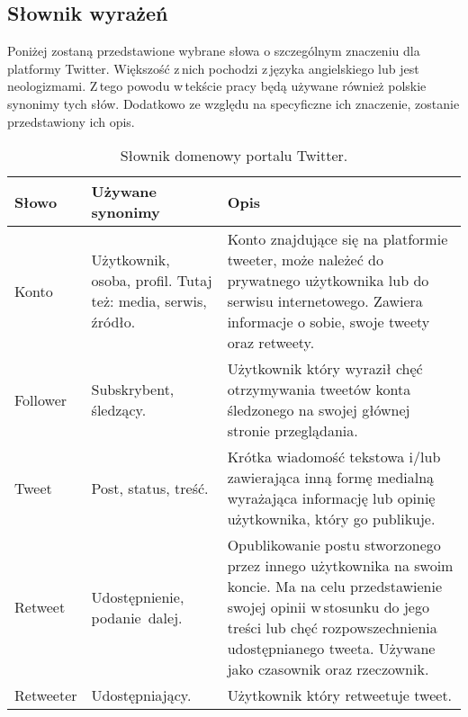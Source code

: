\subsection{Słownik wyrażeń}
Poniżej zostaną przedstawione wybrane słowa o szczególnym znaczeniu dla platformy Twitter. Większość z\,nich pochodzi z\,języka angielskiego lub jest neologizmami. Z\,tego powodu w\,tekście pracy będą używane również polskie synonimy tych słów. Dodatkowo ze względu na specyficzne ich znaczenie, zostanie przedstawiony ich opis.

\begin{table}[!h] \label{tab:slowniktwitter} \centering
\caption{Słownik domenowy portalu Twitter.}
\begin{tabular} { | m{2cm} | m{}| m{7cm} | } \hline
Słowo & Używane synonimy & Opis \\  \hline \hline
Konto & Użytkownik, osoba,
  profil. Tutaj też: media, serwis, źródło. & Konto
  znajdujące się na platformie tweeter, może należeć do prywatnego użytkownika
  lub do serwisu internetowego. Zawiera informacje o sobie, swoje tweety oraz
  retweety. \\ 
\hline
Follower & Subskrybent, śledzący. & Użytkownik który
  wyraził chęć otrzymywania tweetów konta śledzonego na swojej głównej stronie
  przeglądania. \\ 
\hline
Tweet & Post, status,
  treść. & Krótka wiadomość
  tekstowa i/lub zawierająca inną formę medialną wyrażająca informację lub
  opinię użytkownika, który go publikuje. \\ 
\hline
Retweet & Udostępnienie,
  \mbox{podanie dalej.} & Opublikowanie postu
  stworzonego przez innego użytkownika na swoim koncie. Ma na celu przedstawienie
  swojej opinii w\,stosunku do jego treści lub chęć rozpowszechnienia
  udostępnianego tweeta. Używane jako czasownik oraz rzeczownik. \\ 
\hline
Retweeter & Udostępniający. & Użytkownik
  który retweetuje tweet. \\
\hline
\end{tabular}
\end{table}